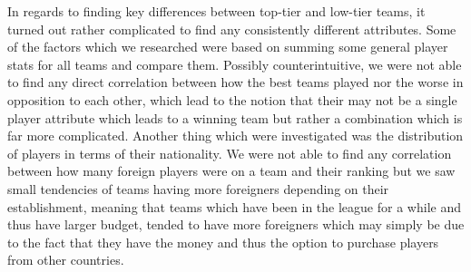 \documentclass[Report.tex]{subfiles}
\begin{document}
In regards to finding key differences between top-tier and low-tier teams, it turned out rather complicated to find any consistently different attributes. Some of the factors which we researched were based on summing some general player stats for all teams and compare them. Possibly counterintuitive, we were not able to find any direct correlation between how the best teams played nor the worse in opposition to each other, which lead to the notion that their may not be a single player attribute which leads to a winning team but rather a combination which is far more complicated. Another thing which were investigated was the distribution of players in terms of their nationality. We were not able to find any correlation between how many foreign players were on a team and their ranking but we saw small tendencies of teams having more foreigners depending on their establishment, meaning that teams which have been in the league for a while and thus have larger budget, tended to have more foreigners which may simply be due to the fact that they have the money and thus the option to purchase players from other countries. 

	
\end{document}

